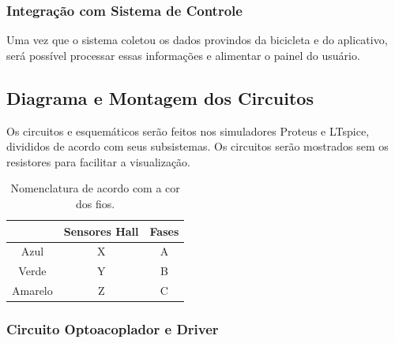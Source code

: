		\subsubsection{Integração com Sistema de Controle}
		Uma vez que o sistema coletou os dados provindos da bicicleta e do aplicativo, será possível processar essas informações e alimentar o painel do usuário.


	\subsection{Diagrama e Montagem dos Circuitos}
	Os circuitos e esquemáticos serão feitos nos simuladores Proteus e LTspice, divididos de acordo com seus subsistemas. Os circuitos serão mostrados sem os resistores para facilitar a visualização.
	\newpage
	
	\begin{table}[!htb]
		\caption{Nomenclatura de acordo com a cor dos fios.}
		\centering
		\label{Nomenclatura_de_acordo_com_a_cor_dos_fios}
		\begin{tabular}{ccc}
			\cline{2-3} & Sensores Hall & Fases \\ \hline
			Azul & X & A \\ \hline
			Verde & Y & B \\ \hline
			Amarelo & Z & C \\ \hline
		\end{tabular}
	\end{table}
	

	
		\subsubsection{Circuito Optoacoplador e Driver}
		
